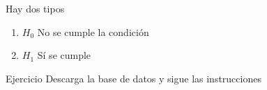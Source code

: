 \documentclass[
  11pt,
  ignorenonframetext,
]{beamer}
\begin{document}
\begin{frame}{Hay dos tipos}
\protect\hypertarget{hay-dos-tipos}{}
\begin{enumerate}
\item
  \(H_0\) No se cumple la condición
\item
  \(H_1\) Sí se cumple
\end{enumerate}
\end{frame}

\begin{frame}{Ejercicio}
\protect\hypertarget{ejercicio}{}
Descarga la base de datos y sigue las instrucciones
\end{frame}
\end{document}
